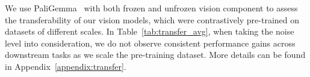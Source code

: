 

We use PaliGemma~\citep{beyer2024paligemma} with both frozen and unfrozen vision component to assess the transferability of our vision models, which were contrastively pre-trained on datasets of different scales. In Table~\ref{tab:transfer_avg}, when taking the noise level into consideration, we do not observe consistent performance gains across downstream tasks as we scale the pre-training dataset. More details can be found in Appendix~\ref{appendix:transfer}.


%
